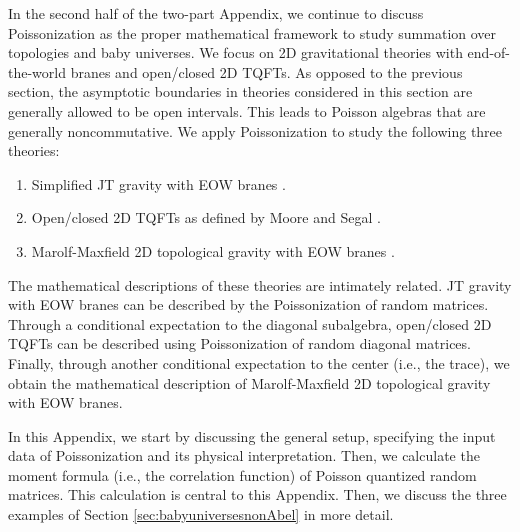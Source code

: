 \documentclass[a4paper,11pt]{article}
\theoremstyle{definition}
\numberwithin{equation}{section}
\begin{document}
In the second half of the two-part Appendix, we continue to discuss Poissonization as the proper mathematical framework to study summation over topologies and baby universes. We focus on 2D gravitational theories with end-of-the-world branes and open/closed 2D TQFTs. As opposed to the previous section, the asymptotic boundaries in theories considered in this section are generally allowed to be open intervals. This leads to Poisson algebras that are generally noncommutative. We apply Poissonization to study the following three theories:
\begin{enumerate}
    \item Simplified JT gravity with EOW branes \cite{Penington:2019kki}.
    \item Open/closed 2D TQFTs as defined by Moore and Segal \cite{@Moore-Segal,@Banerjee-Moore}.
    \item Marolf-Maxfield 2D topological gravity with EOW branes \cite{MM}.
\end{enumerate}
The mathematical descriptions of these theories are intimately related. JT gravity with EOW branes can be described by the Poissonization of random matrices. Through a conditional expectation to the diagonal subalgebra, open/closed 2D TQFTs can be described using Poissonization of random diagonal matrices. Finally, through another conditional expectation to the center (i.e., the trace), we obtain the mathematical description of Marolf-Maxfield 2D topological gravity with EOW branes. 


In this Appendix, we start by discussing the general setup, specifying the input data of Poissonization and its physical interpretation. Then, we calculate the moment formula (i.e., the correlation function) of Poisson quantized random matrices. This calculation is central to this Appendix. Then, we discuss the three examples of Section \ref{sec:babyuniversesnonAbel} in more detail. 
\end{document}
